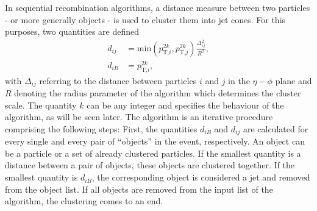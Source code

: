In sequential recombination algorithms, a distance measure between two particles - or more generally objects - is used to cluster them into jet cones.
For this purposes, two quantities are defined
\begin{equation}
\begin{aligned}
\label{eq:Antikt}
d_{ij} &= \text{min}\left( p_{\text{T,}i}^{2k},p_{\text{T,}j}^{2k} \right) \frac{\Delta_{ij}^2}{R^2},\\
d_{iB} &= p_{\text{T,}i}^{2k},
\end{aligned} 
\end{equation}
with $\Delta_{ij}$ referring to the distance between particles $i$ and $j$ in the $\eta - \phi$ plane and $R$ denoting the radius parameter of the algorithm which determines the cluster scale.
The quantity $k$ can be any integer and specifies the behaviour of the algorithm, as will be seen later.
The algorithm is an iterative procedure comprising the following steps: 
First, the quantities $d_{iB}$ and $d_{ij}$ are calculated for every single and every pair of ``objects'' in the event, respectively.
An object can be a particle or a set of already clustered particles.
If the smallest quantity is a distance between a pair of objects, these objects are clustered together.
If the smallest quantity is $d_{iB}$, the corresponding object is considered a jet and removed from the object list.
If all objects are removed from the input list of the algorithm, the clustering comes to an end.

